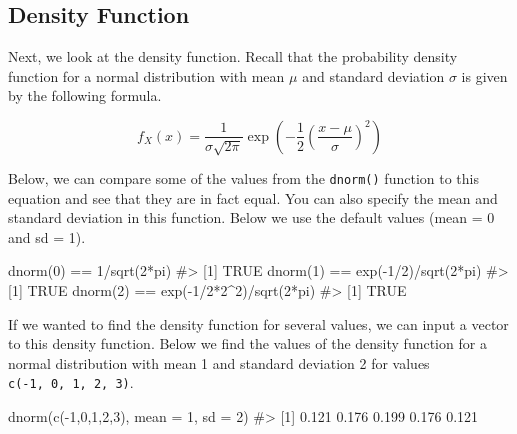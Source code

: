 \documentclass[
  letterpaper,
]{krantz}
\makeatletter
\newenvironment{Shaded}{\begin{snugshade}}{\end{snugshade}}
\newcommand{\AttributeTok}[1]{\textcolor[rgb]{0.40,0.45,0.13}{#1}}
\newcommand{\CommentTok}[1]{\textcolor[rgb]{0.37,0.37,0.37}{#1}}
\newcommand{\DecValTok}[1]{\textcolor[rgb]{0.68,0.00,0.00}{#1}}
\newcommand{\FunctionTok}[1]{\textcolor[rgb]{0.28,0.35,0.67}{#1}}
\newcommand{\NormalTok}[1]{\textcolor[rgb]{0.00,0.23,0.31}{#1}}
\newcommand{\SpecialCharTok}[1]{\textcolor[rgb]{0.37,0.37,0.37}{#1}}
\newenvironment{kframe}{%
\medskip{}
\setlength{\fboxsep}{.8em}
 \def\at@end@of@kframe{}%
 \ifinner\ifhmode%
  \def\at@end@of@kframe{\end{minipage}}%
  \begin{minipage}{\columnwidth}%
 \fi\fi%
 \def\FrameCommand##1{\hskip\@totalleftmargin \hskip-\fboxsep
 \colorbox{shadecolor}{##1}\hskip-\fboxsep
     \hskip-\linewidth \hskip-\@totalleftmargin \hskip\columnwidth}%
 \MakeFramed {\advance\hsize-\width
   \@totalleftmargin\z@ \linewidth\hsize
   \@setminipage}}%
 {\par\unskip\endMakeFramed%
 \at@end@of@kframe}
\renewenvironment{Shaded}{\begin{kframe}}{\end{kframe}}
\makeatother
\begin{document}
\subsection{Density Function}\label{density-function}

Next, we look at the density function. Recall that the probability
density function for a normal distribution with mean \(\mu\) and
standard deviation \(\sigma\) is given by the following formula.

\[ f_X(x) = \frac{1}{\sigma \sqrt{2 \pi}} \exp \left(-\frac{1}{2} \left (\frac{x-\mu}{\sigma} \right)^2 \right) \]

Below, we can compare some of the values from the \texttt{dnorm()}
function to this equation and see that they are in fact equal. You can
also specify the mean and standard deviation in this function. Below we
use the default values (mean = 0 and sd = 1).

\begin{Shaded}
\begin{Highlighting}[]
\FunctionTok{dnorm}\NormalTok{(}\DecValTok{0}\NormalTok{) }\SpecialCharTok{==} \DecValTok{1}\SpecialCharTok{/}\FunctionTok{sqrt}\NormalTok{(}\DecValTok{2}\SpecialCharTok{*}\NormalTok{pi)}
\CommentTok{\#\textgreater{} [1] TRUE}
\FunctionTok{dnorm}\NormalTok{(}\DecValTok{1}\NormalTok{) }\SpecialCharTok{==} \FunctionTok{exp}\NormalTok{(}\SpecialCharTok{{-}}\DecValTok{1}\SpecialCharTok{/}\DecValTok{2}\NormalTok{)}\SpecialCharTok{/}\FunctionTok{sqrt}\NormalTok{(}\DecValTok{2}\SpecialCharTok{*}\NormalTok{pi)}
\CommentTok{\#\textgreater{} [1] TRUE}
\FunctionTok{dnorm}\NormalTok{(}\DecValTok{2}\NormalTok{) }\SpecialCharTok{==} \FunctionTok{exp}\NormalTok{(}\SpecialCharTok{{-}}\DecValTok{1}\SpecialCharTok{/}\DecValTok{2}\SpecialCharTok{*}\DecValTok{2}\SpecialCharTok{\^{}}\DecValTok{2}\NormalTok{)}\SpecialCharTok{/}\FunctionTok{sqrt}\NormalTok{(}\DecValTok{2}\SpecialCharTok{*}\NormalTok{pi)}
\CommentTok{\#\textgreater{} [1] TRUE}
\end{Highlighting}
\end{Shaded}

If we wanted to find the density function for several values, we can
input a vector to this density function. Below we find the values of the
density function for a normal distribution with mean 1 and standard
deviation 2 for values \texttt{c(-1,\ 0,\ 1,\ 2,\ 3)}.

\begin{Shaded}
\begin{Highlighting}[]
\FunctionTok{dnorm}\NormalTok{(}\FunctionTok{c}\NormalTok{(}\SpecialCharTok{{-}}\DecValTok{1}\NormalTok{,}\DecValTok{0}\NormalTok{,}\DecValTok{1}\NormalTok{,}\DecValTok{2}\NormalTok{,}\DecValTok{3}\NormalTok{), }\AttributeTok{mean =} \DecValTok{1}\NormalTok{, }\AttributeTok{sd =} \DecValTok{2}\NormalTok{)}
\CommentTok{\#\textgreater{} [1] 0.121 0.176 0.199 0.176 0.121}
\end{Highlighting}
\end{Shaded}
\end{document}
